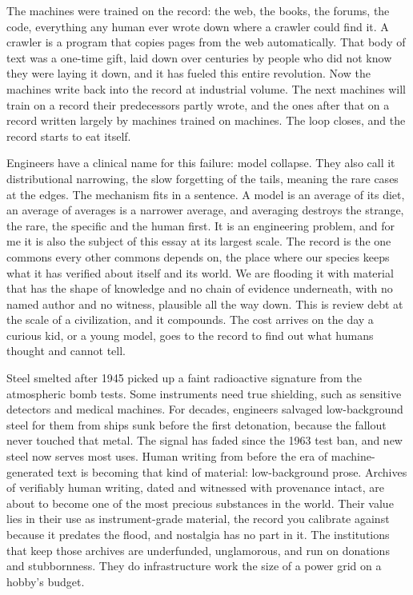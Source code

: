 \documentclass[11pt]{article}
\begin{document}
The machines were trained on the record: the web, the books, the forums, the code, everything any human ever wrote down where a crawler could find it. A crawler is a program that copies pages from the web automatically. That body of text was a one-time gift, laid down over centuries by people who did not know they were laying it down, and it has fueled this entire revolution. Now the machines write back into the record at industrial volume. The next machines will train on a record their predecessors partly wrote, and the ones after that on a record written largely by machines trained on machines. The loop closes, and the record starts to eat itself.

Engineers have a clinical name for this failure: model collapse. They also call it distributional narrowing, the slow forgetting of the tails, meaning the rare cases at the edges. The mechanism fits in a sentence. A model is an average of its diet, an average of averages is a narrower average, and averaging destroys the strange, the rare, the specific and the human first. It is an engineering problem, and for me it is also the subject of this essay at its largest scale. The record is the one commons every other commons depends on, the place where our species keeps what it has verified about itself and its world. We are flooding it with material that has the shape of knowledge and no chain of evidence underneath, with no named author and no witness, plausible all the way down. This is review debt at the scale of a civilization, and it compounds. The cost arrives on the day a curious kid, or a young model, goes to the record to find out what humans thought and cannot tell.

Steel smelted after 1945 picked up a faint radioactive signature from the atmospheric bomb tests. Some instruments need true shielding, such as sensitive detectors and medical machines. For decades, engineers salvaged low-background steel for them from ships sunk before the first detonation, because the fallout never touched that metal. The signal has faded since the 1963 test ban, and new steel now serves most uses. Human writing from before the era of machine-generated text is becoming that kind of material: low-background prose. Archives of verifiably human writing, dated and witnessed with provenance intact, are about to become one of the most precious substances in the world. Their value lies in their use as instrument-grade material, the record you calibrate against because it predates the flood, and nostalgia has no part in it. The institutions that keep those archives are underfunded, unglamorous, and run on donations and stubbornness. They do infrastructure work the size of a power grid on a hobby's budget.
\end{document}

